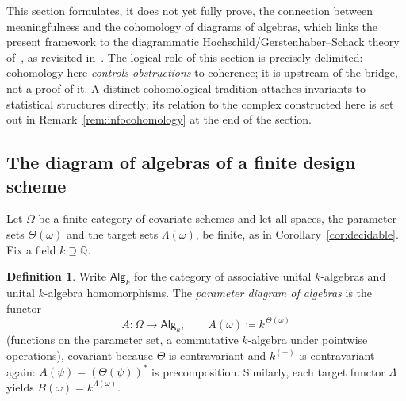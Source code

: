 \documentclass[11pt,a4paper]{article}
\theoremstyle{plain}
\theoremstyle{definition}
\newtheorem{definition}[theorem]{Definition}
\theoremstyle{remark}
\newcommand{\cat}[1]{\mathsf{#1}}
\newcommand{\catO}{\cat{\Omega}}
\newcommand{\Alg}{\cat{Alg}}
\begin{document}
This section formulates, it does not yet fully prove, the connection
between meaningfulness and the cohomology of diagrams of algebras, which
links the present framework to the diagrammatic
Hochschild/\allowbreak Gerstenhaber--Schack theory
of~\cite{gerstenhaber_schack_1983,baues_cohomology_1985}, as revisited
in~\cite[\S3]{caputi_diagrammatic_2025}. The logical
role of this section is precisely
delimited: cohomology here \emph{controls obstructions} to coherence; it is
upstream of the bridge, not a proof of it. A distinct cohomological tradition
attaches invariants to statistical structures directly; its relation to the
complex constructed here is set out in Remark~\ref{rem:infocohomology} at the
end of the section.

\subsection{The diagram of algebras of a finite design scheme}

Let $\catO$ be a finite category of covariate schemes and let all spaces,
the parameter sets $\Theta(\omega)$ and the target sets $\Lambda(\omega)$,
be finite, as in Corollary~\ref{cor:decidable}. Fix a field $k \supseteq \mathbb{Q}$.

\begin{definition}\label{def:diagalg}
Write $\Alg_k$ for the category of associative unital $k$-algebras and unital
$k$-algebra homomorphisms. The \emph{parameter diagram of algebras} is the
functor
\[
A \colon \catO \longrightarrow \Alg_k,
\qquad
A(\omega) \coloneqq k^{\,\Theta(\omega)}
\]
(functions on the parameter set, a commutative $k$-algebra under pointwise
operations), covariant because $\Theta$ is contravariant and
$k^{(-)}$ is contravariant again: $A(\psi) = (\Theta(\psi))^{*}$ is
precomposition. Similarly, each target functor $\Lambda$ yields
$B(\omega) = k^{\Lambda(\omega)}$.
\end{definition}
\end{document}
